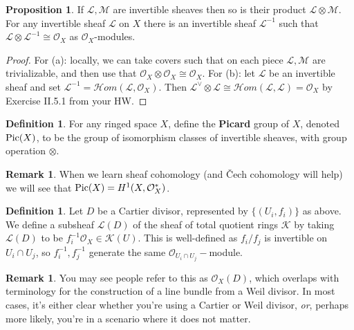 \documentclass[10pt,reqno]{amsart}
\theoremstyle{definition}
\newtheorem{definition}[theorem]{Definition}
\newtheorem{proposition}[theorem]{Proposition}
\newtheorem{remark}[theorem]{Remark}
\theoremstyle{remark}
\numberwithin{equation}{section}
\numberwithin{theorem}{section}
\newcommand*{\red}{\textcolor{red}}
\newcommand{\OO}{{\mathcal O}}
\newcommand{\scrHom}{\mathscr{H}om}
\newcommand{\pic}{\textup{Pic}}
\newcommand{\LL}{{\mathscr L}}
\newcommand{\KK}{{\mathscr K}}
\newcommand{\MM}{{\mathscr M}}
\begin{document}
\begin{proposition} If $\LL, \MM$ are invertible sheaves then so is their product $\LL \otimes \MM$. For any invertible sheaf $\LL$ on $X$ there is an invertible sheaf $\LL^{-1}$ such that $\LL \otimes \LL^{-1} \cong \OO_X$ as $\OO_X$-modules.
\end{proposition}
\begin{proof}
For (a): locally, we can take covers such that on each piece $\LL,\MM$ are trivializable, and then use that $\OO_X \otimes \OO_X \cong \OO_X$. For (b): let $\LL$ be an invertible sheaf and set $\LL^{-1} =  \scrHom(\LL, \OO_X)$. Then $\LL^{\vee} \otimes \LL \cong \scrHom(\LL,\LL) = \OO_X$ by Exercise II.5.1 from your HW.
\end{proof}

\begin{definition} For any ringed space $X$, define the \textbf{Picard} group of $X$, denoted $\pic(X)$, to be the group of isomorphism classes of invertible sheaves, with group operation $\otimes$.
\end{definition}

\begin{remark} When we learn sheaf cohomology (and \v Cech cohomology will help) we will see that $\pic(X) = H^1(X,\OO_X^*)$.
\end{remark}

\begin{definition} Let $D$ be a Cartier divisor, represented by $\{(U_i, f_i)\}$ as above. We define a subsheaf $\LL(D)$ of the sheaf of total quotient rings $\KK$ by taking $\LL(D)$ to be $f_i^{-1}\OO_X \in \KK(U)$. This is well-defined as $f_i/f_j$ is invertible on $U_i \cap U_j$, so $f_i^{-1},f_j^{-1}$ generate the same $\OO_{U_i \cap U_j}-$module.
\end{definition}

\begin{remark} You may see people refer to this as $\OO_X(D)$, which overlaps with terminology for the construction of a line bundle from a Weil divisor. In most cases, it's either clear whether you're using a Cartier or Weil divisor, \textit{or}, perhaps more likely, you're in a scenario where it does not matter.
\end{remark}
\end{document}
